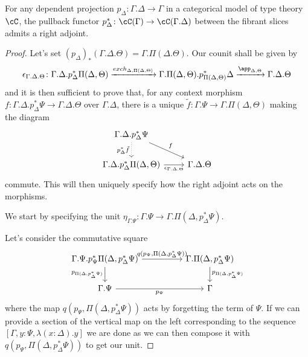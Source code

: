 \begin{lem}
  For any dependent projection $p_\Delta\colon\Gamma.\Delta\rightarrow\Gamma$ in
  a categorical model of type theory $\cC$, the pullback functor
  $p_\Delta^*\colon\cC(\Gamma)\rightarrow\cC(\Gamma.\Delta)$ between the fibrant
  slices admits a right adjoint.
\end{lem}
\begin{proof}
  Let's set $(p_\Delta)_*(\Gamma.\Delta.\Theta)=\Gamma.\Pi(\Delta.\Theta)$. Our
  counit shall be given by
  \[\epsilon_{\Gamma.\Delta.\Theta}\colon\Gamma.\Delta.p^*_\Delta\Pi(\Delta,\Theta)
  \xrightarrow{exch_{\Delta,\Pi(\Delta,\Theta)}}\Gamma.\Pi(\Delta,\Theta).p^*_{\Pi(\Delta,\Theta)}\Delta
  \xrightarrow{\app_{\Delta,\Theta}}\Gamma.\Delta.\Theta\]
  and it is then sufficient to prove that, for any context morphism
  $f\colon\Gamma.\Delta.p^*_\Delta\Psi\rightarrow\Gamma.\Delta.\Theta$ over
  $\Gamma.\Delta$, there is
  a unique $\tilde{f}\colon\Gamma.\Psi\rightarrow\Gamma.\Pi(\Delta,\Theta)$
  making the diagram
  \[\begin{tikzcd}
    {\Gamma.\Delta.p^*_\Delta\Psi} \\
    {\Gamma.\Delta.p^*_\Delta\Pi(\Delta,\Theta)} & {\Gamma.\Delta.\Theta}
    \arrow["f", from=1-1, to=2-2]
    \arrow["{\epsilon_{\Gamma.\Delta.\Theta}}"', from=2-1, to=2-2]
    \arrow["{p^*_\Delta\tilde{f}}"', dotted, from=1-1, to=2-1]
  \end{tikzcd}\]
  commute. This will then uniquely specify how the right adjoint acts on the
  morphisms.

  We start by specifying the unit
  $\eta_{\Gamma.\Psi}\colon\Gamma.\Psi\rightarrow\Gamma.\Pi(\Delta,p^*_{\Delta}\Psi)$.

  Let's consider the commutative square
  \[\begin{tikzcd}[column sep=huge]
    {\Gamma.\Psi.p^*_\Psi\Pi(\Delta,p^*_\Delta\Psi)} & {\Gamma.\Pi(\Delta,p^*_\Delta\Psi)} \\
    {\Gamma.\Psi} & \Gamma
    \arrow["{p_{\Pi(\Delta,p^*_\Delta\Psi)}}"', from=1-1, to=2-1]
    \arrow["{p_{\Psi}}"', from=2-1, to=2-2]
    \arrow["{p_{\Pi(\Delta,p^*_\Delta\Psi)}}", from=1-2, to=2-2]
    \arrow["{q(p_\Psi,\Pi(\Delta,p^*_\Delta\Psi))}", from=1-1, to=1-2]
  \end{tikzcd}\]
  where the map $q(p_\Psi,\Pi(\Delta,p^*_\Delta\Psi))$ acts by forgetting the
  term of $\Psi$. If we can provide a section of the vertical map on the left
  corresponding to the sequence $[\Gamma,y:\Psi,\lambda(x:\Delta).y]$ we are
  done as we can then compose
  it with $q(p_\Psi,\Pi(\Delta,p^*_\Delta\Psi))$ to get our unit.
  

\end{proof}
